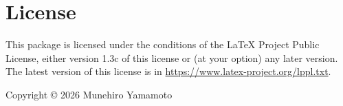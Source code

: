\documentclass{article}
\begin{document}
\section{License}

This package is licensed under the conditions of the \LaTeX{} Project
Public License, either version 1.3c of this license or (at your
option) any later version.  The latest version of this license is in
\url{https://www.latex-project.org/lppl.txt}.

\medskip
\noindent
Copyright \copyright{} 2026 Munehiro Yamamoto
\end{document}
